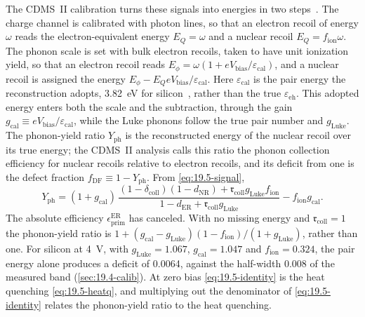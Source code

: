 The CDMS~II calibration turns these signals into energies in two steps~\cite[Eq.~(1), Sect.~2.1]{agnese2018nuclear}. The charge channel is calibrated with photon lines, so that an electron recoil of energy $\omega$ reads the electron-equivalent energy $E_Q = \omega$ and a nuclear recoil $E_Q = f_{\mathrm{ion}}\omega$. The phonon scale is set with bulk electron recoils, taken to have unit ionization yield, so that an electron recoil reads $E_\phi = \omega(1 + eV_{\mathrm{bias}}/\varepsilon_{\mathrm{cal}})$, and a nuclear recoil is assigned the energy $E_\phi - E_QeV_{\mathrm{bias}}/\varepsilon_{\mathrm{cal}}$. Here $\varepsilon_{\mathrm{cal}}$ is the pair energy the reconstruction adopts, \SI{3.82}{eV} for silicon~\cite[Sect.~2]{agnese2018nuclear}, rather than the true $\varepsilon_{\mathrm{eh}}$. This adopted energy enters both the scale and the subtraction, through the gain $g_{\mathrm{cal}} \equiv eV_{\mathrm{bias}}/\varepsilon_{\mathrm{cal}}$, while the Luke phonons follow the true pair number and $g_{\mathrm{Luke}}$. The phonon-yield ratio $Y_{\mathrm{ph}}$ is the reconstructed energy of the nuclear recoil over its true energy; the CDMS~II analysis calls this ratio the phonon collection efficiency for nuclear recoils relative to electron recoils, and its deficit from one is the defect fraction $f_{\mathrm{DF}} \equiv 1 - Y_{\mathrm{ph}}$. From \cref{eq:19.5-signal},
\begin{equation}
  Y_{\mathrm{ph}} = (1 + g_{\mathrm{cal}})\,\frac{(1 - \delta_{\mathrm{coll}})(1 - d_{\mathrm{NR}}) + \mathfrak{r}_{\mathrm{coll}}g_{\mathrm{Luke}}f_{\mathrm{ion}}}{1 - d_{\mathrm{ER}} + \mathfrak{r}_{\mathrm{coll}}g_{\mathrm{Luke}}} - f_{\mathrm{ion}}g_{\mathrm{cal}} .
  \label{eq:19.5-identity}
\end{equation}
The absolute efficiency $\epsilon^{\mathrm{ER}}_{\mathrm{prim}}$ has canceled. With no missing energy and $\mathfrak{r}_{\mathrm{coll}} = 1$ the phonon-yield ratio is $1 + (g_{\mathrm{cal}} - g_{\mathrm{Luke}})(1 - f_{\mathrm{ion}})/(1 + g_{\mathrm{Luke}})$, rather than one. For silicon at \SI{4}{V}, with $g_{\mathrm{Luke}} = 1.067$, $g_{\mathrm{cal}} = 1.047$ and $f_{\mathrm{ion}} = 0.324$, the pair energy alone produces a deficit of 0.0064, against the half-width 0.008 of the measured band (\cref{sec:19.4-calib}). At zero bias \cref{eq:19.5-identity} is the heat quenching \cref{eq:19.5-heatq}, and multiplying out the denominator of \cref{eq:19.5-identity} relates the phonon-yield ratio to the heat quenching.
